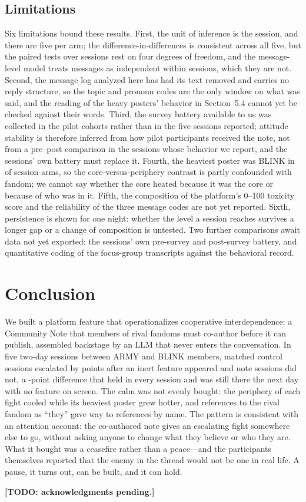 \documentclass[manuscript,screen,review,anonymous]{acmart}
\newcommand{\todonote}[1]{\textcolor{orange!80!black}{\textbf{[TODO: #1]}}}
\begin{document}
\subsection{Limitations}

Six limitations bound these results. First, the unit of inference is the
session, and there are five per arm; the difference-in-differences is
consistent across all five, but the paired tests over sessions rest on four
degrees of freedom, and the message-level model treats messages as
independent within sessions, which they are not. Second, the message log
analyzed here has had its text removed and carries no reply structure, so
the topic and pronoun codes are the only window on what was said, and the
reading of the heavy posters' behavior in Section~5.4 cannot yet be checked
against their words. Third, the survey battery available to us was collected
in the pilot cohorts rather than in the five sessions reported; attitude
stability is therefore inferred from how pilot participants received the
note, not from a pre--post comparison in the sessions whose behavior we
report, and the sessions' own battery must replace it. Fourth, the heaviest
poster was BLINK in \StatheavyBlinkN{} of \StatheavyTotalN{} session-arms,
so the core-versus-periphery contrast is partly confounded with fandom; we
cannot say whether the core heated because it was the core or because of
who was in it. Fifth, the composition of the platform's 0--100 toxicity
score and the reliability of the three message codes are not yet reported.
Sixth, persistence is shown for one night: whether the level a session
reaches survives a longer gap or a change of composition is untested. Two
further comparisons await data not yet exported: the sessions' own
pre-survey and post-survey battery, and quantitative coding of the
focus-group transcripts against the behavioral record.

\section{Conclusion}

We built a platform feature that operationalizes cooperative interdependence:
a Community Note that members of rival fandoms must co-author before it can
publish, assembled backstage by an LLM that never enters the conversation. In
five two-day sessions between ARMY and BLINK members, matched control
sessions escalated by \StatctrlChangeM{} points after an inert feature
appeared and note sessions did not, a \StatdidM-point difference that held
in every session and was still there the next day with no feature on
screen. The calm was not evenly bought: the periphery of each fight cooled
while its heaviest poster grew hotter, and references to the rival fandom
as ``they'' gave way to references by name. The pattern is consistent with an
attention account: the co-authored note gives an escalating fight somewhere
else to go, without asking anyone to change what they believe or who they
are. What it bought was a ceasefire rather than a peace---and the
participants themselves reported that the enemy in the thread would not be
one in real life. A pause, it turns out, can be built, and it can hold.

\begin{acks}
\todonote{acknowledgments pending.}
\end{acks}



\end{document}

